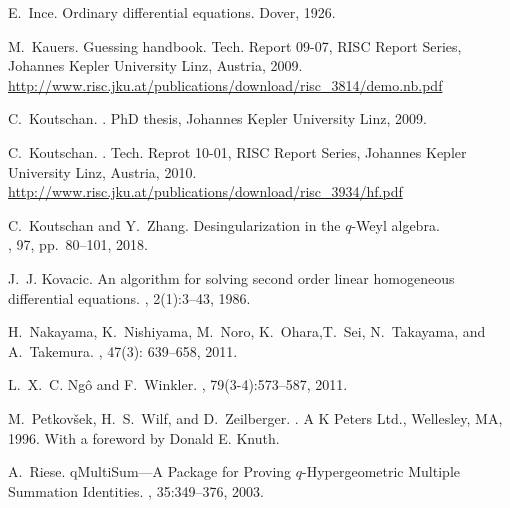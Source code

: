 \documentclass[10pt,a4paper]{article}
\begin{document}
\begin{thebibliography}{10}
E.~Ince.
\newblock Ordinary differential equations.
\newblock Dover, 1926.

M.~Kauers.
\newblock Guessing handbook.
\newblock Tech. Report 09-07, RISC Report Series, Johannes Kepler University Linz, Austria, 2009. \\
\href{http://www.risc.jku.at/publications/download/risc_3814/demo.nb.pdf}{http:/$\!$/www.risc.jku.at/publications/download/risc\_3814/demo.nb.pdf}


C.~Koutschan.
.
\newblock PhD thesis, Johannes Kepler University Linz, 2009.

C.~Koutschan.
.
\newblock Tech. Reprot 10-01, RISC Report Series, Johannes Kepler University Linz, Austria, 2010. \\
\href{http://www.risc.jku.at/publications/download/risc_3934/hf.pdf}{http:/$\!$/www.risc.jku.at/publications/download/risc\_3934/hf.pdf}



C.~Koutschan and Y.~Zhang.
\newblock Desingularization in the $q$-Weyl algebra. \\
, 97, pp.\ 80–101, 2018. 

J.~J. Kovacic.
\newblock An algorithm for solving second order linear homogeneous differential
  equations.
, 2(1):3--43, 1986.

H.~Nakayama, K.~Nishiyama, M.~Noro, K.~Ohara,T.~Sei, N.~Takayama, and A.~Takemura.
, 47(3): 639--658, 2011. 




L.~X.~C. {Ng\^o} and F.~Winkler.
, 79(3-4):573--587, 2011.



M.~Petkov{\v{s}}ek, H.~S.~Wilf, and D.~Zeilberger.
.
\newblock A K Peters Ltd., Wellesley, MA, 1996.
\newblock With a foreword by Donald E. Knuth.

A.~Riese.
\newblock qMultiSum---A Package for Proving $q$-Hypergeometric Multiple Summation Identities.
, 35:349--376, 2003.



\end{thebibliography}
\end{document}
